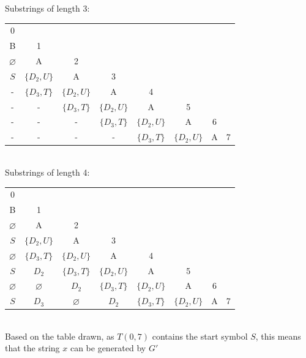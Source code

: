 \documentclass[letterpaper]{article}
\theoremstyle{plain}
\theoremstyle{definition}
\theoremstyle{remark}
\begin{document}
Substrings of length 3:\\[1em]
\begin{tabular}{@{}c c c c c c c c@{}}
0 &   &   &   &   &   &   &   \\
B & 1 &   &   &   &   &   &   \\
$\varnothing$ & A & 2 &   &   &   &   &   \\
$S$ & $\{D_2,U\}$& A & 3 &   &   &   &   \\
- & $\{D_3,T\}$ & $\{D_2,U\}$ & A & 4 &   &   &   \\
- & - & $\{D_3,T\}$ & $\{D_2,U\}$ & A & 5 &   &   \\
- & - & - & $\{D_3,T\}$ & $\{D_2,U\}$ & A & 6 &   \\
- & - & - & - & $\{D_3,T\}$ & $\{D_2,U\}$ & A & 7 \\
\end{tabular}\\[1em]
Substrings of length 4:\\[1em]
\begin{tabular}{@{}c c c c c c c c@{}}
0 &   &   &   &   &   &   &   \\
B & 1 &   &   &   &   &   &   \\
$\varnothing$ & A & 2 &   &   &   &   &   \\
$S$ & $\{D_2,U\}$& A & 3 &   &   &   &   \\
$\varnothing$ & $\{D_3,T\}$ & $\{D_2,U\}$ & A & 4 &   &   &   \\
$S$ & $D_2$ & $\{D_3,T\}$ & $\{D_2,U\}$ & A & 5 &   &   \\
$\varnothing$ & $\varnothing$ & $D_2$ & $\{D_3,T\}$ & $\{D_2,U\}$ & A & 6 &   \\
$S$ & $D_3$ & $\varnothing$ & $D_2$ & $\{D_3,T\}$ & $\{D_2,U\}$ & A & 7 \\
\end{tabular}\\[1em]
Based on the table drawn, as $T(0,7)$ contains the start symbol $S$, this means that the string $x$ can be generated by $G'$
\newpage
\end{document}
